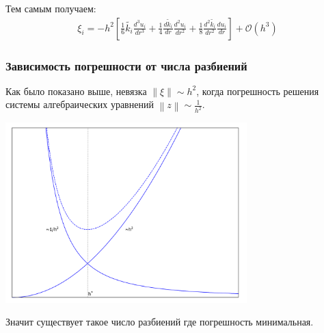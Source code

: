 Тем самым получаем:
\begin{align*}
  \xi_i = - h^2 \left [ \frac{1}{6}\tilde{k_i} \frac{d^3 u_i}{d r^3} + \frac{1}{4}\frac{d \tilde{k}_i}{dr} \frac{d^2 u_i}{d r^2} + \frac{1}{8}\frac{d^2 \tilde{k_i}}{dr^2} \frac{d u_i}{d r} \right ] + \mathcal{O}(h^3)
\end{align*}

\subsubsection{Зависимость погрешности от числа разбиений}

Как было показано выше, невязка $\left\lVert \xi \right\rVert \sim h^2$, 
когда погрешность решения системы алгебраических уравнений $ \left\lVert z \right\rVert \sim \frac{1}{h^2} $.
\begin{center}
  \includegraphics[width=0.7\textwidth]{img/err.pdf}
\end{center}

Значит существует такое число разбиений где погрешность минимальная.